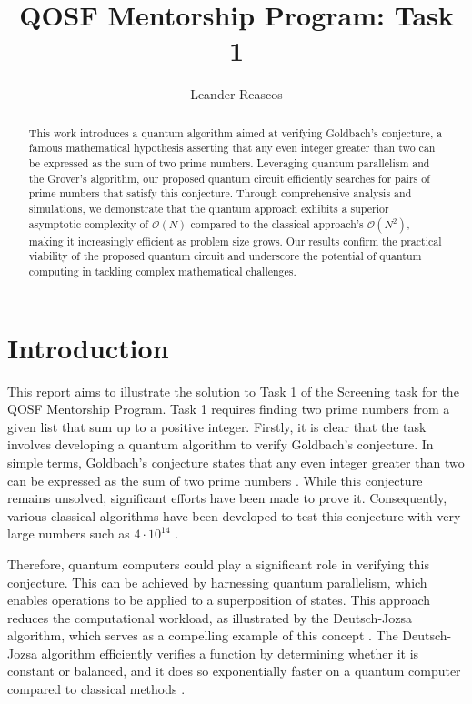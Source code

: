 \documentclass[aps,prapplied,longbibliography]{article}
\title{QOSF Mentorship Program: Task 1}
\author{Leander Reascos}
\begin{document}
    \maketitle

    \begin{abstract}
        This work introduces a quantum algorithm aimed at verifying Goldbach's conjecture, a famous mathematical hypothesis asserting that any even integer greater than two can be expressed as the sum of two prime numbers. Leveraging quantum parallelism and the Grover's algorithm, our proposed quantum circuit efficiently searches for pairs of prime numbers that satisfy this conjecture. Through comprehensive analysis and simulations, we demonstrate that the quantum approach exhibits a superior asymptotic complexity of $\mathcal{O}(N)$ compared to the classical approach's $\mathcal{O}(N^2)$, making it increasingly efficient as problem size grows. Our results confirm the practical viability of the proposed quantum circuit and underscore the potential of quantum computing in tackling complex mathematical challenges.
    \end{abstract}

    \section{Introduction}

    This report aims to illustrate the solution to Task 1 of the Screening task for the QOSF Mentorship Program. Task 1 requires finding two prime numbers from a given list that sum up to a positive integer. Firstly, it is clear that the task involves developing a quantum algorithm to verify Goldbach's conjecture. In simple terms, Goldbach's conjecture states that any even integer greater than two can be expressed as the sum of two prime numbers \cite{wang2002goldbach}. While this conjecture remains unsolved, significant efforts have been made to prove it. Consequently, various classical algorithms have been developed to test this conjecture with very large numbers such as $4\cdot10^{14}$ \cite{richstein2001verifying}.

    Therefore, quantum computers could play a significant role in verifying this conjecture. This can be achieved by harnessing quantum parallelism, which enables operations to be applied to a superposition of states. This approach reduces the computational workload, as illustrated by the Deutsch-Jozsa algorithm, which serves as a compelling example of this concept \cite{collins1998deutsch}. The Deutsch-Jozsa algorithm efficiently verifies a function by determining whether it is constant or balanced, and it does so exponentially faster on a quantum computer compared to classical methods \cite{collins1998deutsch}.
\end{document}
